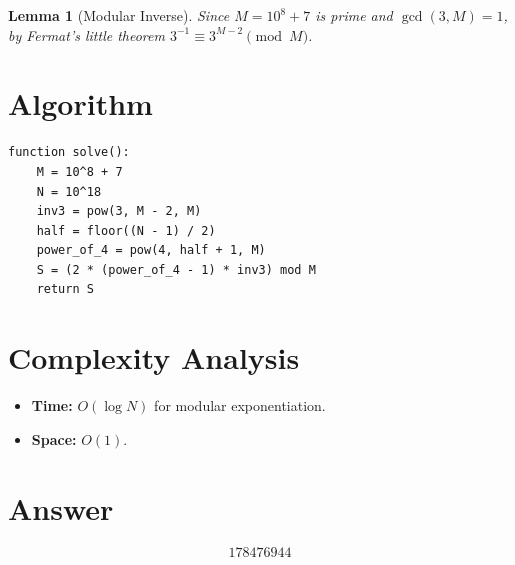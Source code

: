 \documentclass[11pt]{article}
\newtheorem{lemma}[theorem]{Lemma}
\begin{document}
\begin{lemma}[Modular Inverse]
Since $M = 10^8 + 7$ is prime and $\gcd(3, M) = 1$, by Fermat's little theorem $3^{-1} \equiv 3^{M-2} \pmod{M}$.
\end{lemma}

\section{Algorithm}

\begin{verbatim}
function solve():
    M = 10^8 + 7
    N = 10^18
    inv3 = pow(3, M - 2, M)
    half = floor((N - 1) / 2)
    power_of_4 = pow(4, half + 1, M)
    S = (2 * (power_of_4 - 1) * inv3) mod M
    return S
\end{verbatim}

\section{Complexity Analysis}

\begin{itemize}
\item \textbf{Time:} $O(\log N)$ for modular exponentiation.
\item \textbf{Space:} $O(1)$.
\end{itemize}

\section{Answer}

\[
\boxed{178476944}
\]
\end{document}
